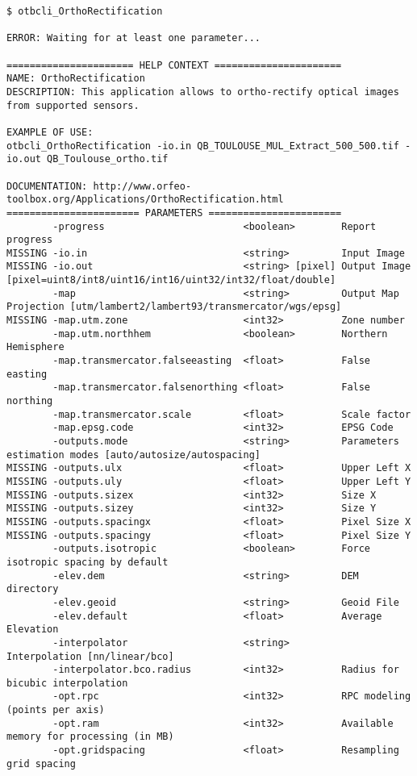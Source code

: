 \begin{scriptsize}
\begin{verbatim}
$ otbcli_OrthoRectification

ERROR: Waiting for at least one parameter...

====================== HELP CONTEXT ======================
NAME: OrthoRectification
DESCRIPTION: This application allows to ortho-rectify optical images from supported sensors.

EXAMPLE OF USE:
otbcli_OrthoRectification -io.in QB_TOULOUSE_MUL_Extract_500_500.tif -io.out QB_Toulouse_ortho.tif

DOCUMENTATION: http://www.orfeo-toolbox.org/Applications/OrthoRectification.html
======================= PARAMETERS =======================
        -progress                        <boolean>        Report progress
MISSING -io.in                           <string>         Input Image
MISSING -io.out                          <string> [pixel] Output Image  [pixel=uint8/int8/uint16/int16/uint32/int32/float/double]
        -map                             <string>         Output Map Projection [utm/lambert2/lambert93/transmercator/wgs/epsg]
MISSING -map.utm.zone                    <int32>          Zone number
        -map.utm.northhem                <boolean>        Northern Hemisphere
        -map.transmercator.falseeasting  <float>          False easting
        -map.transmercator.falsenorthing <float>          False northing
        -map.transmercator.scale         <float>          Scale factor
        -map.epsg.code                   <int32>          EPSG Code
        -outputs.mode                    <string>         Parameters estimation modes [auto/autosize/autospacing]
MISSING -outputs.ulx                     <float>          Upper Left X
MISSING -outputs.uly                     <float>          Upper Left Y
MISSING -outputs.sizex                   <int32>          Size X
MISSING -outputs.sizey                   <int32>          Size Y
MISSING -outputs.spacingx                <float>          Pixel Size X
MISSING -outputs.spacingy                <float>          Pixel Size Y
        -outputs.isotropic               <boolean>        Force isotropic spacing by default
        -elev.dem                        <string>         DEM directory
        -elev.geoid                      <string>         Geoid File
        -elev.default                    <float>          Average Elevation
        -interpolator                    <string>         Interpolation [nn/linear/bco]
        -interpolator.bco.radius         <int32>          Radius for bicubic interpolation
        -opt.rpc                         <int32>          RPC modeling (points per axis)
        -opt.ram                         <int32>          Available memory for processing (in MB)
        -opt.gridspacing                 <float>          Resampling grid spacing
\end{verbatim}
\end{scriptsize}


